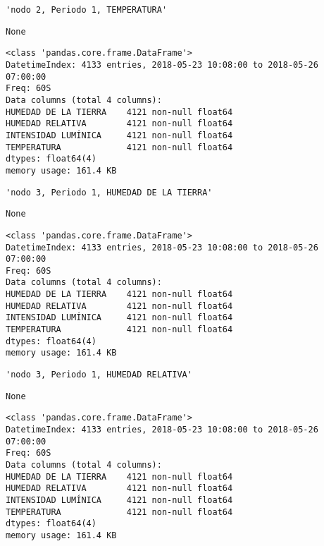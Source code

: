 \documentclass[11pt]{article}
\begin{document}
    
    \begin{verbatim}
'nodo 2, Periodo 1, TEMPERATURA'
    \end{verbatim}

    
    
    \begin{verbatim}
None
    \end{verbatim}

    
    \begin{Verbatim}[commandchars=\\\{\}]
<class 'pandas.core.frame.DataFrame'>
DatetimeIndex: 4133 entries, 2018-05-23 10:08:00 to 2018-05-26 07:00:00
Freq: 60S
Data columns (total 4 columns):
HUMEDAD DE LA TIERRA    4121 non-null float64
HUMEDAD RELATIVA        4121 non-null float64
INTENSIDAD LUMÍNICA     4121 non-null float64
TEMPERATURA             4121 non-null float64
dtypes: float64(4)
memory usage: 161.4 KB

    \end{Verbatim}

    
    \begin{verbatim}
'nodo 3, Periodo 1, HUMEDAD DE LA TIERRA'
    \end{verbatim}

    
    
    \begin{verbatim}
None
    \end{verbatim}

    
    \begin{Verbatim}[commandchars=\\\{\}]
<class 'pandas.core.frame.DataFrame'>
DatetimeIndex: 4133 entries, 2018-05-23 10:08:00 to 2018-05-26 07:00:00
Freq: 60S
Data columns (total 4 columns):
HUMEDAD DE LA TIERRA    4121 non-null float64
HUMEDAD RELATIVA        4121 non-null float64
INTENSIDAD LUMÍNICA     4121 non-null float64
TEMPERATURA             4121 non-null float64
dtypes: float64(4)
memory usage: 161.4 KB

    \end{Verbatim}

    
    \begin{verbatim}
'nodo 3, Periodo 1, HUMEDAD RELATIVA'
    \end{verbatim}

    
    
    \begin{verbatim}
None
    \end{verbatim}

    
    \begin{Verbatim}[commandchars=\\\{\}]
<class 'pandas.core.frame.DataFrame'>
DatetimeIndex: 4133 entries, 2018-05-23 10:08:00 to 2018-05-26 07:00:00
Freq: 60S
Data columns (total 4 columns):
HUMEDAD DE LA TIERRA    4121 non-null float64
HUMEDAD RELATIVA        4121 non-null float64
INTENSIDAD LUMÍNICA     4121 non-null float64
TEMPERATURA             4121 non-null float64
dtypes: float64(4)
memory usage: 161.4 KB

    \end{Verbatim}
\end{document}
